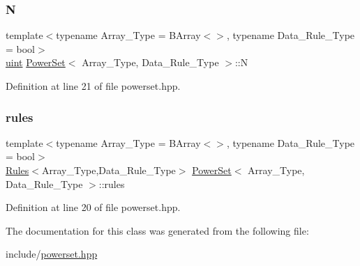 \subsubsection{\texorpdfstring{N}{N}}
{\footnotesize\ttfamily template$<$typename Array\+\_\+\+Type  = B\+Array$<$$>$, typename Data\+\_\+\+Rule\+\_\+\+Type  = bool$>$ \\
\hyperlink{typedefs_8hpp_a91ad9478d81a7aaf2593e8d9c3d06a14}{uint} \hyperlink{class_power_set}{Power\+Set}$<$ Array\+\_\+\+Type, Data\+\_\+\+Rule\+\_\+\+Type $>$\+::N}



Definition at line 21 of file powerset.\+hpp.

\mbox{\label{class_power_set_afde1de561c80f2d0064ba6267aef2edd}} 
\subsubsection{\texorpdfstring{rules}{rules}}
{\footnotesize\ttfamily template$<$typename Array\+\_\+\+Type  = B\+Array$<$$>$, typename Data\+\_\+\+Rule\+\_\+\+Type  = bool$>$ \\
\hyperlink{class_rules}{Rules}$<$Array\+\_\+\+Type,Data\+\_\+\+Rule\+\_\+\+Type$>$ \hyperlink{class_power_set}{Power\+Set}$<$ Array\+\_\+\+Type, Data\+\_\+\+Rule\+\_\+\+Type $>$\+::rules}



Definition at line 20 of file powerset.\+hpp.



The documentation for this class was generated from the following file\+:\begin{DoxyCompactItemize}
\item 
include/\hyperlink{powerset_8hpp}{powerset.\+hpp}\end{DoxyCompactItemize}
